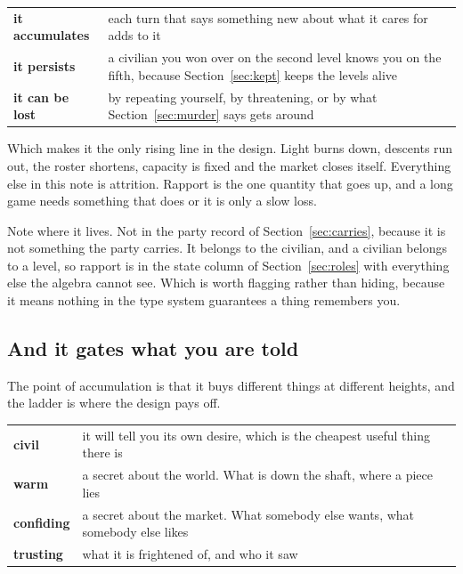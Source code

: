 \documentclass[11pt,a4paper]{article}
\begin{document}
\begin{center}
\begin{tabular}{@{}l@{\hspace{5mm}}>{\raggedright\arraybackslash}p{}@{}}
\toprule
\textbf{it accumulates} & each turn that says something new about what it cares for adds to it \\[1mm]
\textbf{it persists}    & a civilian you won over on the second level knows you on the fifth,
because Section~\ref{sec:kept} keeps the levels alive \\[1mm]
\textbf{it can be lost} & by repeating yourself, by threatening, or by what
Section~\ref{sec:murder} says gets around \\
\bottomrule
\end{tabular}
\end{center}

\begin{sectionbox}
Which makes it the only rising line in the design. Light burns down, descents run out, the roster
shortens, capacity is fixed and the market closes itself. Everything else in this note is
attrition. Rapport is the one quantity that goes up, and a long game needs something that does or
it is only a slow loss.
\end{sectionbox}

Note where it lives. Not in the party record of Section~\ref{sec:carries}, because it is not
something the party carries. It belongs to the civilian, and a civilian belongs to a level, so
rapport is in the state column of Section~\ref{sec:roles} with everything else the algebra cannot
see. Which is worth flagging rather than hiding, because it means nothing in the type system
guarantees a thing remembers you.

\subsection{And it gates what you are told}

The point of accumulation is that it buys different things at different heights, and the ladder is
where the design pays off.

\begin{center}
\begin{tabular}{@{}l@{\hspace{4mm}}>{\raggedright\arraybackslash}p{}@{}}
\toprule
\textbf{civil}      & it will tell you its own desire, which is the cheapest useful thing there is \\[1mm]
\textbf{warm}       & a secret about the world. What is down the shaft, where a piece lies \\[1mm]
\textbf{confiding}  & a secret about the market. What somebody else wants, what somebody else likes \\[1mm]
\textbf{trusting}   & what it is frightened of, and who it saw \\
\bottomrule
\end{tabular}
\end{center}
\end{document}
